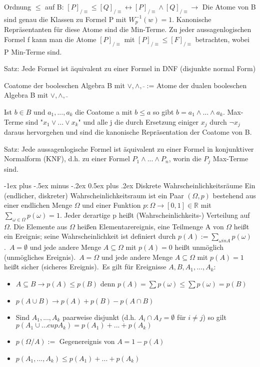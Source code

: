 \documentclass[a4paper]{article}
\makeatletter
\renewcommand{\section}{\@startsection{section}{1}{0mm}%
                                {-1ex plus -.5ex minus -.2ex}%
                                {0.5ex plus .2ex}%
                                {\normalfont\large\bfseries}}
\makeatother
\begin{document}
\begin{multicols}{3}
    Ordnung $\leq$ auf B: $[P]_{/\equiv} \leq [Q]_{/\equiv} \leftrightarrow [P]_{/\equiv} \wedge [Q]_{/\equiv} \rightarrow$ Die Atome von B sind genau die Klassen zu Formel P mit $W_p^{-1}({w})=1$. Kanonische Repräsentanten für diese Atome sind die Min-Terme.
    Zu jeder aussagenlogischen Formel f kann man die Atome $[P]_{/\equiv}$ mit $[P]_{/\equiv} \leq [F]_{/\equiv}$ betrachten, wobei P Min-Terme sind.
    
    Satz: Jede Formel ist äquivalent zu einer Formel in DNF (disjunkte normal Form)
    
    Coatome der booleschen Algebra B mit $\vee, \wedge, \bar{}$ := Atome der dualen booleschen Algebra B mit $\vee, \wedge, \bar{}$
    
    Ist $b\in B$ und $a_1,...,a_k$ die Coatome a mit $b\leq a$ so gibt $b=a_1 \wedge ... \wedge a_k$. Max-Terme sind "$x_1\vee ... \vee x_k$" und alle j die durch Ersetzung einiger $x_j$ durch $\neg x_j$ daraus hervorgehen und sind die kanonische Repräsentation der Coatome von B.
    
    Satz: Jede aussagenlogische Formel ist äquivalent zu einer Formel in konjunktiver Normalform (KNF), d.h. zu einer Formel $P_1\wedge ... \wedge P_n$, worin die $P_j$ Max-Terme sind.
    
    \section{Diskrete Wahrscheinlichkeitsräume}
    Ein (endlicher, diskreter) Wahrscheinlichkeitsraum ist ein Paar $(\Omega, p)$ bestehend aus einer endlichen Menge $\Omega$ und einer Funktion $p:\Omega \rightarrow [0,1]\in \mathbb{R}$ mit $\sum_{\omega \in \Omega} p(\omega)=1$. Jeder derartige p heißt (Wahrscheinlichkeits-) Verteilung auf $\Omega$. Die Elemente aus $\Omega$ heißen Elementarereignis, eine Teilmenge A von $\Omega$ heißt ein Ereignis; seine Wahrscheinlichkeit ist definiert durch $p(A):=\sum_{\omega in A} p(\omega)$.\
    $A=\emptyset$ und jede andere Menge $A\subseteq \Omega$ mit $p(A)=0$ heißt unmöglich (unmögliches Ereignis).\
    $A=\Omega$ und jede andere Menge $A\subseteq \Omega$ mit $p(A)=1$ heißt sicher (sicheres Ereignis).\
    Es gilt für Ereignisse $A,B,A_1,...,A_k$:
    \begin{itemize}
        \item $A\subseteq B \rightarrow p(A)\leq p(B)$ denn $p(A)=\sum p(\omega) \leq \sum p(\omega) = p(B)$
        \item $p(A\cup B) \rightarrow p(A)+p(B)-p(A\cap B)$
        \item Sind $A_1,...,A_k$ paarweise disjunkt (d.h. $A_i \cap A_J=\emptyset$ für $i\not =j$) so gilt $p(A_1 \cup ... cup A_k)= p(A_1)+...+p(A_k)$
        \item $p(\Omega / A):=$ Gegenereignis von $A=1-p(A)$
        \item $p(A_1,...,A_k) \leq p(A_1)+...+p(A_k)$
    \end{itemize}
    

\end{multicols}
\end{document}
